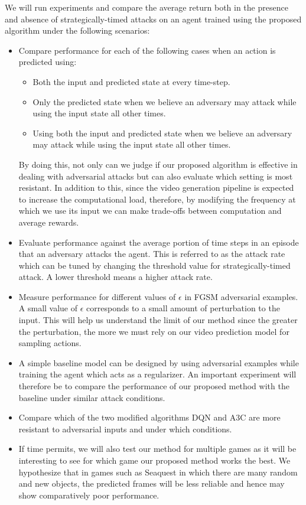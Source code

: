 We will run experiments and compare the average return both in the presence and absence of strategically-timed attacks on an agent trained using the proposed algorithm under the following scenarios:
\begin{itemize}
\item  Compare performance for each of the following cases when an action is predicted using: 
\begin{itemize}
\item Both the input and predicted state at every time-step.
\item Only the predicted state when we believe an adversary may attack while using the input state all other times.
\item Using both the input and predicted state when we believe an adversary may attack while using the input state all other times.  
\end{itemize}
By doing this, not only can we judge if our proposed algorithm is effective in dealing with adversarial attacks but can also evaluate which setting is most resistant. In addition to this, since the video generation pipeline is expected to increase the computational load, therefore, by modifying the frequency at which we use its input we can make trade-offs between computation and average rewards.
\item Evaluate performance against the average portion of time steps in an episode that an adversary attacks the agent. This is referred to as the attack rate which can be tuned by changing the threshold value for strategically-timed attack. A lower threshold means a higher attack rate. 
\item Measure performance for different values of $\epsilon$ in FGSM adversarial examples. A small value of $\epsilon$ corresponds to a small amount of perturbation to the input. This will help us understand the limit of our method since the greater the perturbation, the more we must rely on our video prediction model for sampling actions.
\item A simple baseline model can be designed by using adversarial examples while training the agent which acts as a regularizer. An important experiment will therefore be to compare the performance of our proposed method with the baseline under similar attack conditions. 
\item Compare which of the two modified algorithms DQN and A3C are more resistant to adversarial inputs and under which conditions. 
\item If time permits, we will also test our method for multiple games as it will be interesting to see for which game our proposed method works the best. We hypothesize that in games such as Seaquest in which there are many random and new objects, the predicted frames will be less reliable and hence may show comparatively poor performance. 
\end{itemize}

